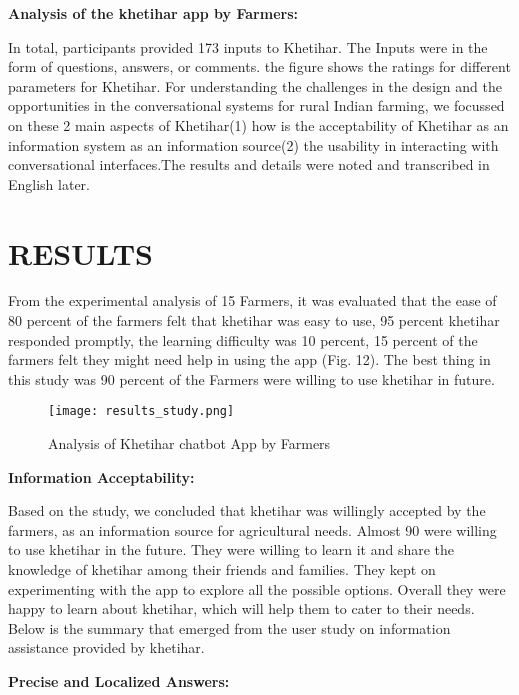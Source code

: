 \documentclass[10pt,conference]{IEEEtran}
\begin{document}
{\raggedright\textbf{Analysis of the khetihar app by Farmers:}\newline}
{\raggedright
In total, participants provided 173 inputs to Khetihar. The Inputs were in the form of questions, answers, or comments. the figure shows the ratings for different parameters for Khetihar. For understanding the challenges in the design and the opportunities in the conversational systems for rural Indian farming, we focussed on these 2 main aspects of Khetihar\newline(1) how is the acceptability of Khetihar as an information system as an information source\newline(2) the usability in interacting with conversational interfaces.The results and details were noted and transcribed in English later. 
}

    \section{RESULTS}

{\raggedright
From the experimental analysis of 15 Farmers, it was evaluated that the ease of 80 percent of the farmers felt that khetihar was easy to use, 95 percent khetihar responded promptly, the learning difficulty was 10 percent, 15 percent of the farmers felt they might need help in using the app (Fig. 12). The best thing in this study was 90 percent of the Farmers were willing to use khetihar in future.
}

\begin{figure}[h]
 \centering
   \texttt{[image: results\_study.png]}
  \caption{Analysis of Khetihar chatbot App by Farmers}
\end{figure}

{\raggedright
\textbf{Information Acceptability:}\newline
}
{\raggedright
Based on the study, we concluded that khetihar was willingly accepted by the farmers, as an information source for agricultural needs. Almost 90 were willing to use khetihar in the future. They were willing to learn it and share the knowledge of khetihar among their friends and families. They kept on experimenting with the app to explore all the possible options. Overall they were happy to learn about khetihar, which will help them to cater to their needs. 
Below is the summary that emerged from the user study on information assistance provided by khetihar.
}


{\raggedright
\textbf{Precise and Localized Answers: }
}
\end{document}

